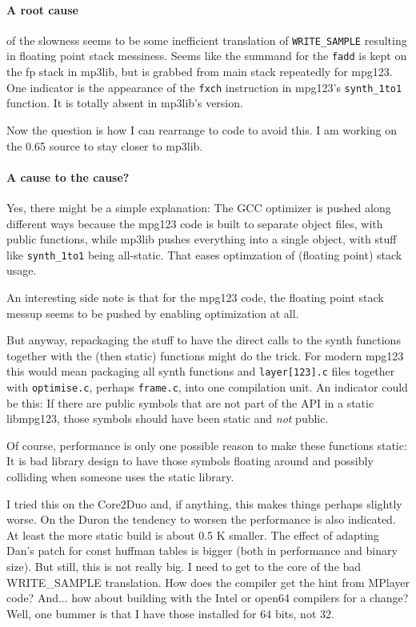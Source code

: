 \documentclass[a4paper,12pt]{scrartcl}
\begin{document}
\paragraph{A root cause}
of the slowness seems to be some inefficient translation of \verb:WRITE_SAMPLE: resulting in floating point stack messiness.
Seems like the summand for the \verb:fadd: is kept on the fp stack in mp3lib, but is grabbed from main stack repeatedly for mpg123. One indicator is the appearance of the \verb:fxch: instruction in mpg123's \verb:synth_1to1: function.
It is totally absent in mp3lib's version.

Now the question is how I can rearrange to code to avoid this. I am working on the 0.65 source to stay closer to mp3lib.

\paragraph{A cause to the cause?}
Yes, there might be a simple explanation: The GCC optimizer is pushed along different ways because the mpg123 code is built to separate object files, with public functions, while mp3lib pushes everything into a single object, with stuff like \verb:synth_1to1: being all-static.
That eases optimzation of (floating point) stack usage.

An interesting side note is that for the mpg123 code, the floating point stack messup seems to be pushed by enabling optimization at all.

But anyway, repackaging the stuff to have the direct calls to the synth functions together with the (then static) functions might do the trick.
For modern mpg123 this would mean packaging all synth functions and \verb:layer[123].c: files together with \verb:optimise.c:, perhaps \verb:frame.c:, into one compilation unit.
An indicator could be this: If there are public symbols that are not part of the API in a static libmpg123, those symbols should have been static and {\em not} public.

Of course, performance is only one possible reason to make these functions static:
It is bad library design to have those symbols floating around and possibly colliding when someone uses the static library.

I tried this on the Core2Duo and, if anything, this makes things perhaps slightly worse. On the Duron the tendency to worsen the performance is also indicated. At least the more static build is about 0.5 K smaller. The effect of adapting Dan's patch for const huffman tables is bigger (both in performance and binary size).
But still, this is not really big. I need to get to the core of the bad WRITE\_SAMPLE translation. How does the compiler get the hint from MPlayer code? And... how about building with the Intel or open64 compilers for a change?
Well, one bummer is that I have those installed for 64 bits, not 32.
\end{document}
